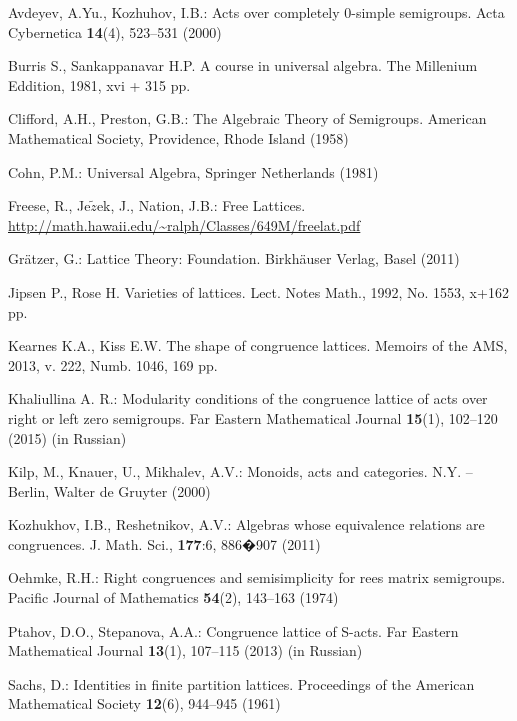 \documentclass{birkau}
\numberwithin{equation}{section}
\theoremstyle{plain}
\theoremstyle{definition}
\begin{document}
	
	
	\begin{thebibliography}{99}

 Avdeyev, A.Yu., Kozhuhov, I.B.:
        Acts over completely 0-simple semigroups.
        Acta Cybernetica \textbf{14}(4), 523--531 (2000)

     Burris S., Sankappanavar H.P. A course in universal algebra. The Millenium Eddition, 1981, xvi + 315 pp.

        Clifford, A.H., Preston, G.B.:
        The Algebraic Theory of Semigroups.
        American  Mathematical  Society,  Providence, Rhode  Island (1958)

        Cohn, P.M.:
        Universal Algebra,
        Springer Netherlands (1981)

        Freese, R., Je$\tilde{z}$ek, J., Nation, J.B.:
        Free Lattices.
        \url{http://math.hawaii.edu/~ralph/Classes/649M/freelat.pdf}

        Gr\"atzer, G.:
        Lattice Theory: Foundation.
        Birkh\"auser Verlag, Basel (2011)

        Jipsen P., Rose H. Varieties of lattices. Lect. Notes Math., 1992, No. 1553, x+162 pp.

 Kearnes K.A., Kiss E.W. The shape of congruence lattices. Memoirs of the AMS, 2013, v. 222, Numb. 1046, 169 pp.

        Khaliullina A. R.:
        Modularity conditions of the congruence lattice of acts over right or left zero semigroups.
        Far Eastern Mathematical Journal \textbf{15}(1), 102--120 (2015) (in Russian)

        Kilp, M., Knauer, U., Mikhalev, A.V.:
        Monoids, acts and categories.
        N.Y. -- Berlin, Walter de Gruyter (2000)

        Kozhukhov, I.B., Reshetnikov, A.V.:
        Algebras whose equivalence relations are congruences.
        J. Math. Sci., {\bf 177}:6, 886�907 (2011)

        Oehmke, R.H.:
        Right congruences and semisimplicity for rees matrix semigroups.
        Pacific Journal of Mathematics \textbf{54}(2), 143--163 (1974)

        Ptahov, D.O., Stepanova, A.A.:
        Congruence lattice of S-acts.
        Far Eastern Mathematical Journal
        \textbf{13}(1), 107--115 (2013) (in Russian)

        Sachs, D.:
        Identities in finite partition lattices.
        Proceedings of the American Mathematical Society
        \textbf{12}(6), 944--945 (1961)
	
	\end{thebibliography}
	
\end{document}
